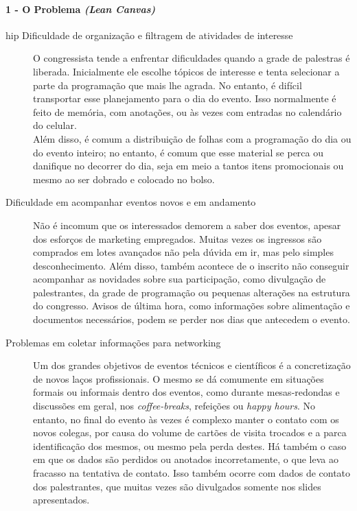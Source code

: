 \documentclass[12pt,a4paper,twoside,hyphens,english,brazil]{abntex2}
\newcommand{\hip}{{\color{BlueViolet}\framebox[1.1\width]{HIP}}}
\begin{document}
\paragraph*{1 - O Problema \emph{(Lean Canvas)}}
\begin{description}
\item[hip{} Dificuldade de organização e filtragem de atividades de interesse] 
O congressista tende a enfrentar dificuldades quando a grade de palestras é liberada. Inicialmente ele escolhe tópicos de interesse e tenta selecionar a parte da programação que mais lhe agrada. No entanto, é difícil transportar esse planejamento para o dia do evento. Isso normalmente é feito de memória, com anotações, ou às vezes com entradas no calendário do celular.\\
Além disso, é comum a distribuição de folhas com a programação do dia ou do evento inteiro; no entanto, é comum que esse material se perca ou danifique no decorrer do dia, seja em meio a tantos itens promocionais ou mesmo ao ser dobrado e colocado no bolso.

\item[\hip{} Dificuldade em acompanhar eventos novos e em andamento]
Não é incomum que os interessados demorem a saber dos eventos, apesar dos esforços de marketing empregados. Muitas vezes os ingressos são comprados em lotes avançados não pela dúvida em ir, mas pelo simples desconhecimento. Além disso, também acontece de o inscrito não conseguir acompanhar as novidades sobre sua participação, como divulgação de palestrantes, da grade de programação ou pequenas alterações na estrutura do congresso. Avisos de última hora, como informações sobre alimentação e documentos necessários, podem se perder nos dias que antecedem o evento.

\item[\hip{} Problemas em coletar informações para networking]
Um dos grandes objetivos de eventos técnicos e científicos é a concretização de novos laços profissionais. O mesmo se dá comumente em situações formais ou informais dentro dos eventos, como durante mesas-redondas e discussões em geral, nos \emph{coffee-breaks}, refeições ou \emph{happy hours}. No entanto, no final do evento às vezes é complexo manter o contato com os novos colegas, por causa do volume de cartões de visita trocados e a parca identificação dos mesmos, ou mesmo pela perda destes. Há também o caso em que os dados são perdidos ou anotados incorretamente, o que leva ao fracasso na tentativa de contato. Isso também ocorre com dados de contato dos palestrantes, que muitas vezes são divulgados somente nos slides apresentados.


\end{description}
\end{document}
